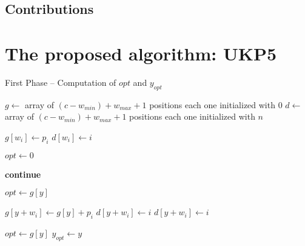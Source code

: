 \documentclass[runningheads,a4paper]{llncs}
\begin{document}
\subsection{Contributions}

\section{The proposed algorithm: UKP5}

\begin{algorithm}
\caption{First Phase -- Computation of $opt$ and $y_{opt}$}\label{alg:ukp6_write_phase}
\begin{algorithmic}[1]
  \State \(g \gets\) array of \((c - w_{min}) + w_{max} + 1\) positions each one initialized with \(0\)\label{create_g}
  \State \(d \gets\) array of \((c - w_{min}) + w_{max} + 1\) positions each one initialized with \(n\)\label{create_d}
  
  \label{begin_trivial_bounds}
      \State \(g[w_i] \gets p_i\)
      \State \(d[w_i] \gets i\)
    \EndIf
  \EndFor\label{end_trivial_bounds}

  \State \(opt \gets 0\)\label{init_opt}

  \label{main_ext_loop_begin}
    \label{if_less_than_opt_begin}
    	\State \textbf{continue}
    \EndIf\label{if_less_than_opt_end}
    
    \State \(opt \gets g[y]\)\label{update_opt}
    
    \label{main_inner_loop_begin}
      \label{if_new_lower_bound_begin}
        \State \(g[y + w_i] \gets g[y] + p_i\)
        \State \(d[y + w_i] \gets i\)
        \State \(d[y + w_i] \gets i\)
      \EndIf\label{if_new_lower_bound_end}
    \EndFor\label{main_inner_loop_end}
  \EndFor\label{main_ext_loop_end}

  \label{get_y_opt_loop_begin}
    \label{last_loop_inner_if}
      \State \(opt \gets g[y]\)
      \State \(y_{opt} \gets y\)
    \EndIf
  \EndFor\label{get_y_opt_loop_end}
\EndProcedure
\end{algorithmic}
\end{algorithm}
\end{document}
